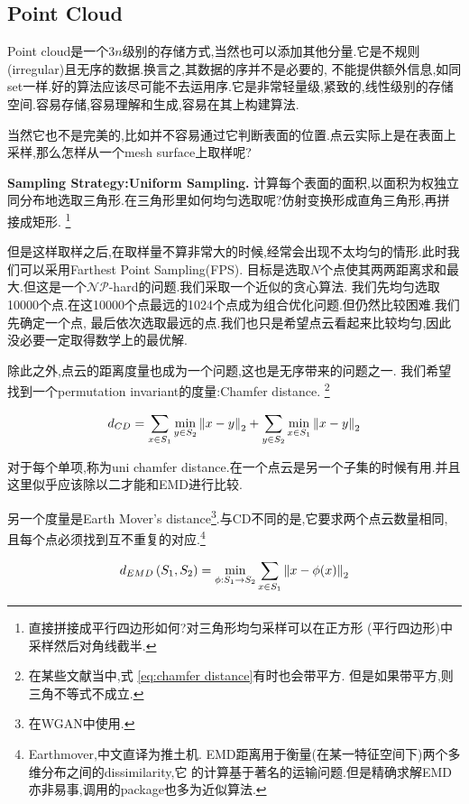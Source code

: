 \subsection{Point Cloud}

Point cloud是一个$3n$级别的存储方式,当然也可以添加其他分量.它是不规则(irregular)且无序的数据.换言之,其数据的序并不是必要的,
不能提供额外信息,如同set一样.好的算法应该尽可能不去运用序.它是非常轻量级,紧致的,线性级别的存储空间.容易存储,容易理解和生成,容易在其上构建算法.

当然它也不是完美的,比如并不容易通过它判断表面的位置.点云实际上是在表面上采样,那么怎样从一个mesh surface上取样呢?

\textbf{Sampling Strategy:Uniform Sampling.}
计算每个表面的面积,以面积为权独立同分布地选取三角形.在三角形里如何均匀选取呢?仿射变换形成直角三角形,再拼接成矩形.
\footnote{直接拼接成平行四边形如何?对三角形均匀采样可以在正方形 (平行四边形)中采样然后对角线截半.}

但是这样取样之后,在取样量不算非常大的时候,经常会出现不太均匀的情形.此时我们可以采用Farthest Point Sampling(FPS).
目标是选取$N$个点使其两两距离求和最大.但这是一个$\mathcal{NP}$-hard的问题.我们采取一个近似的贪心算法.
我们先均匀选取10000个点.在这10000个点最远的1024个点成为组合优化问题.但仍然比较困难.我们先确定一个点,
最后依次选取最远的点.我们也只是希望点云看起来比较均匀,因此没必要一定取得数学上的最优解.

除此之外,点云的距离度量也成为一个问题,这也是无序带来的问题之一.
我们希望找到一个permutation invariant的度量:Chamfer distance.
\footnote{在某些文献当中,式 \ref{eq:chamfer distance}有时也会带平方.
但是如果带平方,则三角不等式不成立.}

\begin{equation}
    d_{CD} = \sum_{x \in S_1} \min_{y \in S_2} \left \Vert x - y \right \Vert_{2} + \sum_{y \in S_2} \min_{x \in S_1} \left \Vert x - y \right \Vert_{2}
    \label{eq:chamfer distance}
\end{equation}

对于每个单项,称为uni chamfer distance.在一个点云是另一个子集的时候有用.并且这里似乎应该除以二才能和EMD进行比较.

另一个度量是Earth Mover's distance\footnote{在WGAN中使用.}.与CD不同的是,它要求两个点云数量相同,
且每个点必须找到互不重复的对应.\footnote{Earthmover,中文直译为推土机.
EMD距离用于衡量(在某一特征空间下)两个多维分布之间的dissimilarity,它
的计算基于著名的运输问题.但是精确求解EMD亦非易事,调用的package也多为近似算法.}

\begin{equation}
    d_{E M D}\left(S_{1}, S_{2}\right)=\min _{\phi: S_{1} \rightarrow S_{2}} \sum_{x \in S_{1}} \left \Vert x-\phi(x) \right \Vert_{2}
\end{equation}

